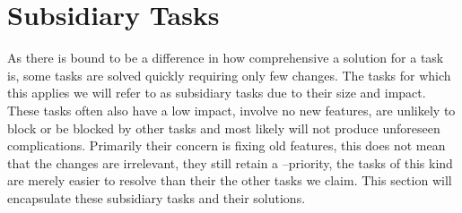 \section{Subsidiary Tasks}\label{lessers1}
As there is bound to be a difference in how comprehensive a solution for a task is, some tasks are solved quickly requiring only few changes.
The tasks for which this applies we will refer to as subsidiary tasks due to their size and impact.
These tasks often also have a low impact, involve no new features, are unlikely to block or be blocked by other tasks and most likely will not produce unforeseen complications.
Primarily their concern is fixing old features, this does not mean that the changes are irrelevant, they still retain a \phigh--priority, the tasks of this kind are merely easier to resolve than their the other tasks we claim.
This section will encapsulate these subsidiary tasks and their solutions.


